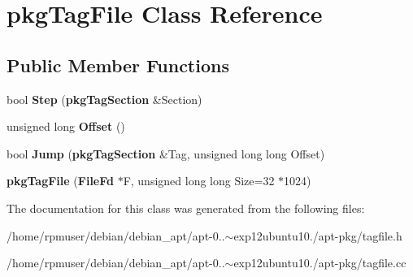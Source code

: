 \section{pkg\-Tag\-File \-Class \-Reference}
\label{classpkgTagFile}
\subsection*{\-Public \-Member \-Functions}
\begin{DoxyCompactItemize}
\item 
bool {\bfseries \-Step} ({\bf pkg\-Tag\-Section} \&\-Section)\label{classpkgTagFile_a3de3d6b13a5c6c4ee7cb970f20faba77}

\item 
unsigned long {\bfseries \-Offset} ()\label{classpkgTagFile_aa99d9f0dbb0d6dc37bbce867d004f978}

\item 
bool {\bfseries \-Jump} ({\bf pkg\-Tag\-Section} \&\-Tag, unsigned long long \-Offset)\label{classpkgTagFile_af961393bbf3a4752b08fce7845bcdca5}

\item 
{\bfseries pkg\-Tag\-File} ({\bf \-File\-Fd} $\ast$\-F, unsigned long long \-Size=32 $\ast$1024)\label{classpkgTagFile_a8dc27d52e070eb6c1ebd9bdc76d83fb2}

\end{DoxyCompactItemize}


\-The documentation for this class was generated from the following files\-:\begin{DoxyCompactItemize}
\item 
/home/rpmuser/debian/debian\-\_\-apt/apt-\/0..$\sim$exp12ubuntu10./apt-\/pkg/tagfile.\-h\item 
/home/rpmuser/debian/debian\-\_\-apt/apt-\/0..$\sim$exp12ubuntu10./apt-\/pkg/tagfile.\-cc\end{DoxyCompactItemize}
